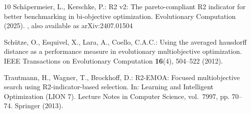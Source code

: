\documentclass[runningheads]{llncs}
\begin{document}
\begin{thebibliography}{10}
Sch{\"a}permeier, L., Kerschke, P.: {R2 v2}: The pareto-compliant {R2}
  indicator for better benchmarking in bi-objective optimization. Evolutionary
  Computation  (2025). , also available as
  arXiv:2407.01504

Sch{\"u}tze, O., Esquivel, X., Lara, A., Coello, C.A.C.: Using the averaged
  hausdorff distance as a performance measure in evolutionary multiobjective
  optimization. IEEE Transactions on Evolutionary Computation  \textbf{16}(4),
  504--522 (2012). 

Trautmann, H., Wagner, T., Brockhoff, D.: {R2-EMOA}: Focused multiobjective
  search using {R2}-indicator-based selection. In: Learning and Intelligent
  Optimization (LION 7). Lecture Notes in Computer Science, vol.~7997, pp.
  70--74. Springer (2013). 

\end{thebibliography}
\end{document}
